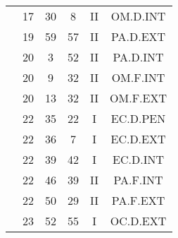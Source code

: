 \documentclass[12pt, a4paper]{article}
\begin{document}
\begin{multicols}{3}
{\begin{tabular}{c c c c c c}
	 	 	 	 & 17 & 30 & 8 & II & OM.D.INT\\%
	 	 	 	 & 19 & 59 & 57 & II & PA.D.EXT\\%
	 	 	 	 & 20 & 3 & 52 & II & PA.D.INT\\%
	 	 	 	 & 20 & 9 & 32 & II & OM.F.INT\\%
	 	 	 	 & 20 & 13 & 32 & II & OM.F.EXT\\%
	 	 	 	 & 22 & 35 & 22 & I & EC.D.PEN\\%
	 	 	 	 & 22 & 36 & 7 & I & EC.D.EXT\\%
	 	 	 	 & 22 & 39 & 42 & I & EC.D.INT\\%
	 	 	 	 & 22 & 46 & 39 & II & PA.F.INT\\%
	 	 	 	 & 22 & 50 & 29 & II & PA.F.EXT\\%
	 	 	 	 & 23 & 52 & 55 & I & OC.D.EXT\\%
	 	 \end{tabular}
 	}
\end{multicols}
\end{document}
